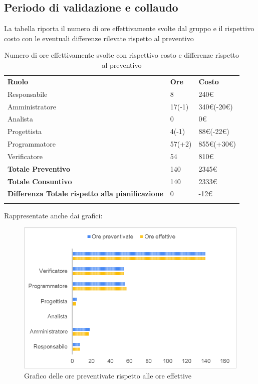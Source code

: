 \subsection{Periodo di validazione e collaudo}
La tabella riporta il numero di ore effettivamente svolte dal gruppo e il rispettivo costo con le eventuali differenze rilevate rispetto al preventivo
\begin{longtable} {							
		>{}p{96mm}  
		>{}p{16mm}
		>{}p{16mm}			
	}			
	\rowcolor{gray!50}
	
	\textbf{Ruolo}            & \textbf{Ore} & \textbf{Costo}       \TBstrut \\
	Responsabile              & 8            & 240\euro             \TBstrut \\
	Amministratore            & 17(-1)       & 340\euro(-20\euro)   \TBstrut \\
	Analista                  & 0            & 0\euro               \TBstrut \\
	Progettista               & 4(-1)        & 88\euro(-22\euro)    \TBstrut \\
	Programmatore             & 57(+2)       & 855\euro(+30\euro)   \TBstrut \\
	Verificatore              & 54           & 810\euro             \TBstrut \\
	\textbf{Totale Preventivo}& 140          & 2345\euro            \TBstrut \\	
	\textbf{Totale Consuntivo}& 140          & 2333\euro            \TBstrut \\	
	\textbf{Differenza Totale rispetto alla pianificazione}& 0           & -12\euro              \TBstrut \\
	\rowcolor{white}
	\caption{Numero di ore effettivamente svolte con rispettivo costo e differenze rispetto al preventivo}	
\end{longtable}

Rappresentate anche dai grafici:
\begin{figure} [H]
	\includegraphics[width=\linewidth]{./img/Grafici/ra-consuntivo1.png}
	\caption{Grafico delle ore preventivate rispetto alle ore effettive}
\end{figure}

